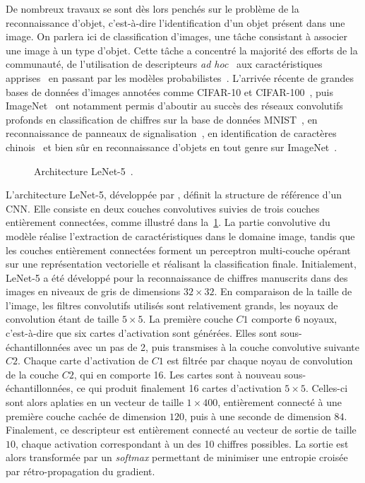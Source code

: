 De nombreux travaux se sont dès lors penchés sur le problème de la reconnaissance d'objet, c'est-à-dire l'identification d'un objet présent dans une image. On parlera ici de classification d'images, une tâche consistant à associer une image à un type d'objet. Cette tâche a concentré la majorité des efforts de la communauté, de l'utilisation de descripteurs \emph{ad hoc}~\cite{ullman_aligning_1989} aux caractéristiques apprises~\cite{vidal-naquet_object_2003} en passant par les modèles probabilistes~\cite{schneiderman_probabilistic_1998}. L'arrivée récente de grandes bases de données d'images annotées comme CIFAR-10 et CIFAR-100~\cite{krizhevsky_learning_2009}, puis ImageNet~\cite{deng_imagenet_2009,russakovsky_imagenet_2015} ont notamment permis d'aboutir au succès des réseaux convolutifs profonds en classification de chiffres sur la base de données MNIST~\cite{lecun_gradient-based_1998}, en reconnaissance de panneaux de signalisation~\cite{stallkamp_german_2011}, en identification de caractères chinois~\cite{liu_icdar_2011} et bien sûr en reconnaissance d'objets en tout genre sur ImageNet~\cite{krizhevsky_imagenet_2012}.

\begin{figure}[t]
  \resizebox{\textwidth}{!}{
    
  }
  \caption[Architecture LeNet-5.]{Architecture LeNet-5~\cite{lecun_gradient-based_1998}.}
  \label{fig:lenet}
\end{figure}

L'architecture LeNet-5, développée par \citet{lecun_gradient-based_1998}, définit la structure de référence d'un \gls{CNN}. Elle consiste en deux couches convolutives suivies de trois couches entièrement connectées, comme illustré dans la~\cref{fig:lenet}. La partie convolutive du modèle réalise l'extraction de caractéristiques dans le domaine image, tandis que les couches entièrement connectées forment un perceptron multi-couche opérant sur une représentation vectorielle et réalisant la classification finale. Initialement, LeNet-5 a été développé pour la reconnaissance de chiffres manuscrits dans des images en niveaux de gris de dimensions $32\times32$. En comparaison de la taille de l'image, les filtres convolutifs utilisés sont relativement grands, les noyaux de convolution étant de taille $5\times5$. La première couche $C1$ comporte 6 noyaux, c'est-à-dire que six cartes d'activation sont générées. Elles sont sous-échantillonnées avec un pas de 2, puis transmises à la couche convolutive suivante $C2$. Chaque carte d'activation de $C1$ est filtrée par chaque noyau de convolution de la couche $C2$, qui en comporte 16. Les cartes sont à nouveau sous-échantillonnées, ce qui produit finalement 16 cartes d'activation $5\times5$. Celles-ci sont alors aplaties en un vecteur de taille $1\times400$, entièrement connecté à une première couche cachée de dimension $120$, puis à une seconde de dimension $84$.
Finalement, ce descripteur est entièrement connecté au vecteur de sortie de taille $10$, chaque activation correspondant à un des 10 chiffres possibles. La sortie est alors transformée par un \emph{softmax} permettant de minimiser une entropie croisée par rétro-propagation du gradient.

